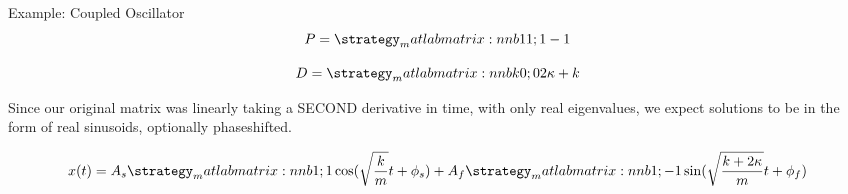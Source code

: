 	\begin{frame}{Example: Coupled Oscillator}
	    $$P = \mat{1 1; 1 -1}$$
        
        $$D = \mat{k 0; 0 2\kappa+k}$$
        
        Since our original matrix was linearly taking a SECOND derivative in time, with only real eigenvalues, we expect solutions to be in the form of real sinusoids, optionally phaseshifted.

        $$x(t) = A_s\mat{1;1}\cos(\sqrt{\frac{k}{m}}t + \phi_s) + A_f\mat{1;-1}\sin(\sqrt{\frac{k + 2\kappa}{m}}t + \phi_f)$$
	\end{frame}
	
